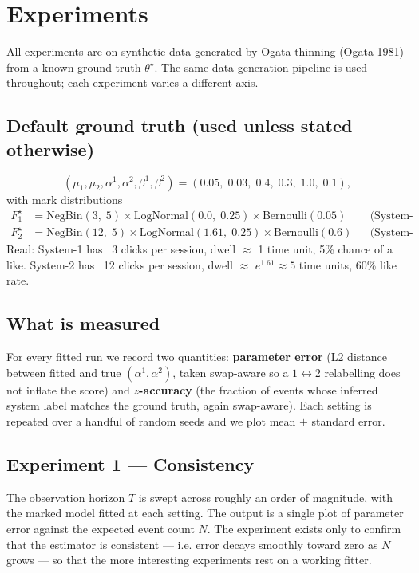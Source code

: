 \documentclass[11pt]{article}
\newcommand{\NegBin}{\mathrm{NegBin}}
\newcommand{\LogNormal}{\mathrm{LogNormal}}
\newcommand{\Bernoulli}{\mathrm{Bernoulli}}
\begin{document}
\section{Experiments}
\label{sec:experiments}

All experiments are on synthetic data generated by Ogata thinning (Ogata 1981) from a known ground-truth $\theta^\star$. The same data-generation pipeline is used throughout; each experiment varies a different axis.

\subsection{Default ground truth (used unless stated otherwise)}

\[
(\mu_1, \mu_2, \alpha^1, \alpha^2, \beta^1, \beta^2) = (0.05,\; 0.03,\; 0.4,\; 0.3,\; 1.0,\; 0.1),
\]
with mark distributions
\begin{align*}
F_1^\star &= \NegBin(3,\; 5) \times \LogNormal(0.0,\; 0.25) \times \Bernoulli(0.05) && \text{(System-1: short, impulsive)} \\
F_2^\star &= \NegBin(12,\; 5) \times \LogNormal(1.61,\; 0.25) \times \Bernoulli(0.6) && \text{(System-2: long, engaged)}
\end{align*}
Read: System-1 has ~3 clicks per session, dwell $\approx$ 1 time unit, 5\% chance of a like. System-2 has ~12 clicks per session, dwell $\approx$ $e^{1.61} \approx 5$ time units, 60\% like rate.

\subsection{What is measured}

For every fitted run we record two quantities: \textbf{parameter error} (L2 distance between fitted and true $(\alpha^1, \alpha^2)$, taken swap-aware so a $1 \leftrightarrow 2$ relabelling does not inflate the score) and \textbf{$z$-accuracy} (the fraction of events whose inferred system label matches the ground truth, again swap-aware). Each setting is repeated over a handful of random seeds and we plot mean $\pm$ standard error.

\subsection{Experiment 1 --- Consistency}

The observation horizon $T$ is swept across roughly an order of magnitude, with the marked model fitted at each setting. The output is a single plot of parameter error against the expected event count $N$. The experiment exists only to confirm that the estimator is consistent --- i.e. error decays smoothly toward zero as $N$ grows --- so that the more interesting experiments rest on a working fitter.
\end{document}
